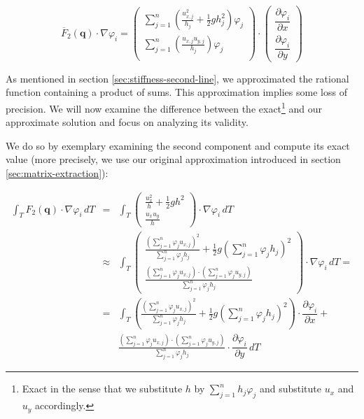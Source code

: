 \documentclass[a4paper, twoside]{article}
\newcommand{\pd}[2]{\dfrac{\partial #1}{\partial #2}}
\renewcommand{\phi}{\varphi}
\begin{document}
\begin{equation}
  \label{eq:point-wise-approx-result-second-line-phi}
  \overline{F}_2(\mathbf{q}) \cdot \nabla \phi_i =
  \begin{pmatrix}
    \sum_{j=1}^n \left(\frac{u_{x,j}^2}{h_j} + \frac{1}{2} g h_j^2\right) \phi_j \\
    \sum_{j=1}^n \left(\frac{u_{x,j} u_{y,j}}{h_j}\right) \phi_j \\
  \end{pmatrix}
  \cdot
  \begin{pmatrix}
    \pd{\phi_i}{x} \\
    \pd{\phi_i}{y}
  \end{pmatrix}
\end{equation}

As mentioned in section \ref{sec:stiffness-second-line}, we approximated the rational function containing a product of sums. This approximation implies some loss of precision. We will now examine the difference between the exact\footnote{Exact in the sense that we substitute $h$ by $\sum_{j=1}^n h_j \phi_j$ and substitute $u_x$ and $u_y$ accordingly.} and our approximate solution and focus on analyzing its validity.

We do so by exemplary examining the second component and compute its exact value (more precisely, we use our original approximation introduced in section \ref{sec:matrix-extraction}):

\begin{eqnarray*}
  \int_T F_2\left(\mathbf{q}\right) \cdot \nabla \phi_i \, dT & = &
  \int_T
  \begin{pmatrix}
    \frac{u_x^2}{h} + \frac{1}{2} g h^2 \\ \frac{u_x u_y}{h}
  \end{pmatrix}
  \cdot \nabla \phi_i \, dT \\
  & \approx & \int_T
  \begin{pmatrix}
    \frac{(\sum_{j=1}^n \phi_j u_{x,j})^2}{\sum_{j=1}^n \phi_j h_j} + \frac{1}{2} g (\sum_{j=1}^n \phi_j h_j)^2 \\
    \frac{(\sum_{j=1}^n \phi_j u_{x,j}) \cdot (\sum_{j=1}^n \phi_j u_{y,j})}{\sum_{j=1}^n \phi_j h_j}
  \end{pmatrix}
  \cdot \nabla \phi_i \, dT = \\
  & = & \int_T
   \left( \frac{(\sum_{j=1}^n \phi_j u_{x,j})^2}{\sum_{j=1}^n \phi_j h_j} + \frac{1}{2} g (\sum_{j=1}^n \phi_j h_j)^2 \right) \cdot \pd{\phi_i}{x} + \\
  & & \frac{(\sum_{j=1}^n \phi_j u_{x,j}) \cdot (\sum_{j=1}^n \phi_j u_{y,j})}{\sum_{j=1}^n \phi_j h_j} \cdot \pd{\phi_i}{y} \, dT
\end{eqnarray*}
\end{document}
